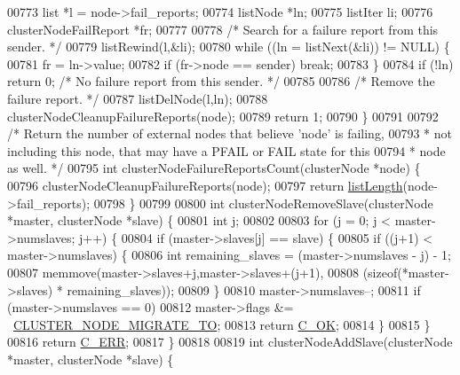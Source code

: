 \begin{DoxyCode}
{{{{{{{{{{{00773     list *l = node->fail\_reports;
00774     listNode *ln;
00775     listIter li;
00776     clusterNodeFailReport *fr;
00777 
00778     \textcolor{comment}{/* Search for a failure report from this sender. */}
00779     listRewind(l,&li);
00780     \textcolor{keywordflow}{while} ((ln = listNext(&li)) != NULL) \{
00781         fr = ln->value;
00782         \textcolor{keywordflow}{if} (fr->node == sender) \textcolor{keywordflow}{break};
00783     \}
00784     \textcolor{keywordflow}{if} (!ln) \textcolor{keywordflow}{return} 0; \textcolor{comment}{/* No failure report from this sender. */}
00785 
00786     \textcolor{comment}{/* Remove the failure report. */}
00787     listDelNode(l,ln);
00788     clusterNodeCleanupFailureReports(node);
00789     \textcolor{keywordflow}{return} 1;
00790 \}
00791 
00792 \textcolor{comment}{/* Return the number of external nodes that believe 'node' is failing,}
00793 \textcolor{comment}{ * not including this node, that may have a PFAIL or FAIL state for this}
00794 \textcolor{comment}{ * node as well. */}
00795 \textcolor{keywordtype}{int} clusterNodeFailureReportsCount(clusterNode *node) \{
00796     clusterNodeCleanupFailureReports(node);
00797     \textcolor{keywordflow}{return} \hyperlink{adlist_8h_afde0ab079f934670e82119b43120e94b}{listLength}(node->fail\_reports);
00798 \}
00799 
00800 \textcolor{keywordtype}{int} clusterNodeRemoveSlave(clusterNode *master, clusterNode *slave) \{
00801     \textcolor{keywordtype}{int} j;
00802 
00803     \textcolor{keywordflow}{for} (j = 0; j < master->numslaves; j++) \{
00804         \textcolor{keywordflow}{if} (master->slaves[j] == slave) \{
00805             \textcolor{keywordflow}{if} ((j+1) < master->numslaves) \{
00806                 \textcolor{keywordtype}{int} remaining\_slaves = (master->numslaves - j) - 1;
00807                 memmove(master->slaves+j,master->slaves+(j+1),
00808                         (\textcolor{keyword}{sizeof}(*master->slaves) * remaining\_slaves));
00809             \}
00810             master->numslaves--;
00811             \textcolor{keywordflow}{if} (master->numslaves == 0)
00812                 master->flags &= ~\hyperlink{cluster_8h_a1d5a62356ed9f5986613c2315a358119}{CLUSTER\_NODE\_MIGRATE\_TO};
00813             \textcolor{keywordflow}{return} \hyperlink{server_8h_a303769ef1065076e68731584e758d3e1}{C\_OK};
00814         \}
00815     \}
00816     \textcolor{keywordflow}{return} \hyperlink{server_8h_af98ac28d5f4d23d7ed5985188e6fb7d1}{C\_ERR};
00817 \}
00818 
00819 \textcolor{keywordtype}{int} clusterNodeAddSlave(clusterNode *master, clusterNode *slave) \{
}}}}}}}}}}}
\end{DoxyCode}
